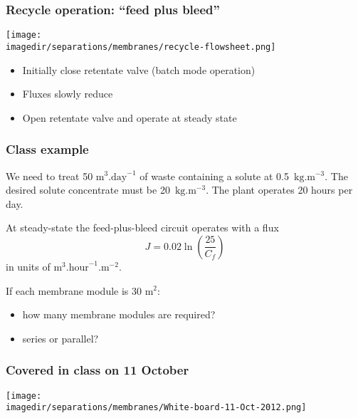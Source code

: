 \begin{frame}\frametitle{Recycle operation: ``feed plus bleed''}
	\begin{center}
		\texttt{[image: \\imagedir/separations/membranes/recycle-flowsheet.png]}
	\end{center}
	\begin{itemize}
		\item	Initially close retentate valve (batch mode operation)
		\item	Fluxes slowly reduce
		\item	Open retentate valve and operate at steady state
	\end{itemize}
\end{frame}

\begin{frame}\frametitle{Class example}
	We need to treat 50 $\text{m}^3\text{.day}^{-1}$ of waste containing a solute at 0.5~$\text{kg}\text{.m}^{-3}$. The desired solute concentrate must be 20~$\text{kg}\text{.m}^{-3}$. The plant operates 20 hours per day.
	
	\vspace{12pt}
	At steady-state the feed-plus-bleed circuit operates with a flux 
	\[
		J = 0.02 \ln \left(\frac{25}{C_f} \right)
	\]
	in units of $\text{m}^3.\text{hour}^{-1}.\text{m}^{-2}$.
	
	\vspace{12pt}
	If each membrane module is 30 m$^2$:	
	\begin{itemize}
		\item	how many membrane modules are required?
		\item	series or parallel?
	\end{itemize}
\end{frame}

\begin{frame}\frametitle{Covered in class on 11 October}
	\begin{center}
		\texttt{[image: \\imagedir/separations/membranes/White-board-11-Oct-2012.png]}
	\end{center}
\end{frame}

